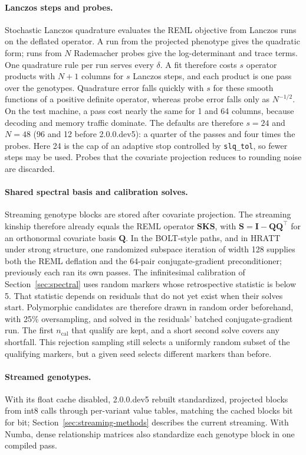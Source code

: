 \documentclass[11pt]{article}
\newcommand{\K}{\mathbf{K}}
\newcommand{\I}{\mathbf{I}}
\newcommand{\code}[1]{\texttt{#1}}
\begin{document}
\paragraph{Lanczos steps and probes.}
Stochastic Lanczos quadrature evaluates the REML objective from Lanczos
runs on the deflated operator. A run from the projected phenotype gives
the quadratic form; runs from $N$ Rademacher probes give the
log-determinant and trace terms. One quadrature rule per run serves every
$\delta$. A fit therefore costs $s$ operator products with $N+1$ columns
for $s$ Lanczos steps, and each product is one pass over the genotypes.
Quadrature error falls quickly with $s$ for these smooth functions of a
positive definite operator, whereas probe error falls only as $N^{-1/2}$.
On the test machine, a pass cost nearly the same for 1 and 64 columns,
because decoding and memory traffic dominate. The defaults are therefore
$s=24$ and $N=48$ (96 and 12 before 2.0.0.dev5): a quarter of the
passes and four times the probes. Here 24 is the
cap of an adaptive stop controlled by \code{slq\_tol}, so fewer steps may
be used. Probes that the covariate projection
reduces to rounding noise are discarded.

\paragraph{Shared spectral basis and calibration solves.}
Streaming genotype blocks are stored after covariate projection. The
streaming kinship therefore already equals the REML operator
$\mathbf S\K\mathbf S$, with $\mathbf S=\I-\mathbf Q\mathbf Q^\top$ for an
orthonormal covariate basis $\mathbf Q$. In the BOLT-style paths, and in
HRATT under strong structure, one randomized subspace iteration of width
128 supplies both the REML deflation and the 64-pair conjugate-gradient
preconditioner; previously each ran its own passes. The infinitesimal
calibration of Section~\ref{sec:spectral} uses random markers whose
retrospective statistic is below 5. That statistic depends on residuals
that do not yet exist when their solves start. Polymorphic candidates are
therefore drawn in random order beforehand, with 25\% oversampling, and
solved in the residuals' batched conjugate-gradient run. The first
$n_{\mathrm{cal}}$ that qualify are kept, and a short second solve covers
any shortfall. This rejection sampling still selects a uniformly random
subset of the qualifying markers, but a given seed selects different
markers than before.

\paragraph{Streamed genotypes.}
With its float cache disabled, 2.0.0.dev5 rebuilt standardized, projected
blocks from int8 calls through per-variant value tables, matching the
cached blocks bit for bit; Section~\ref{sec:streaming-methods} describes
the current streaming. With Numba, dense relationship
matrices also standardize each genotype block in one compiled pass.
\end{document}
